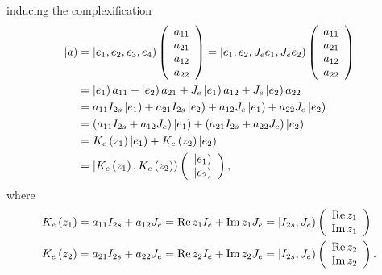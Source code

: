 \documentclass[aps,preprint]{revtex4}%
\begin{document}
inducing the complexification
\begin{align}
\left\vert a\right)   &  =\left\vert e_{1},e_{2},e_{3},e_{4}\right)  \left(
\begin{array}
[c]{c}%
a_{11}\\
a_{21}\\
a_{12}\\
a_{22}%
\end{array}
\right)  =\left\vert e_{1},e_{2},J_{e}e_{1},J_{e}e_{2}\right)  \left(
\begin{array}
[c]{c}%
a_{11}\\
a_{21}\\
a_{12}\\
a_{22}%
\end{array}
\right) \\
&  =\left\vert e_{1}\right)  a_{11}+\left\vert e_{2}\right)  a_{21}%
+J_{e}\left\vert e_{1}\right)  a_{12}+J_{e}\left\vert e_{2}\right)  a_{22}\\
&  =a_{11}I_{2s}\left\vert e_{1}\right)  +a_{21}I_{2s}\left\vert e_{2}\right)
+a_{12}J_{e}\left\vert e_{1}\right)  +a_{22}J_{e}\left\vert e_{2}\right) \\
&  =\left(  a_{11}I_{2s}+a_{12}J_{e}\right)  \left\vert e_{1}\right)  +\left(
a_{21}I_{2s}+a_{22}J_{e}\right)  \left\vert e_{2}\right) \\
&  =K_{e}\left(  z_{1}\right)  \left\vert e_{1}\right)  +K_{e}\left(
z_{2}\right)  \left\vert e_{2}\right) \\
&  =\left\vert K_{e}\left(  z_{1}\right)  ,K_{e}\left(  z_{2}\right)  \right)
\left(
\begin{array}
[c]{c}%
\left\vert e_{1}\right) \\
\left\vert e_{2}\right)
\end{array}
\right)  ,
\end{align}
where%
\begin{align}
K_{e}\left(  z_{1}\right)   &  =a_{11}I_{2s}+a_{12}J_{e}=\operatorname{Re}%
z_{1}I_{e}+\operatorname{Im}z_{1}J_{e}=\left\vert I_{2s},J_{e}\right)  \left(
%
\begin{array}
[c]{c}%
\operatorname{Re}z_{1}\\
\operatorname{Im}z_{1}%
\end{array}
\right) \\
K_{e}\left(  z_{2}\right)   &  =a_{21}I_{2s}+a_{22}J_{e}=\operatorname{Re}%
z_{2}I_{e}+\operatorname{Im}z_{2}J_{e}=\left\vert I_{2s},J_{e}\right)  \left(
%
\begin{array}
[c]{c}%
\operatorname{Re}z_{2}\\
\operatorname{Im}z_{2}%
\end{array}
\right)  .
\end{align}
\end{document}
